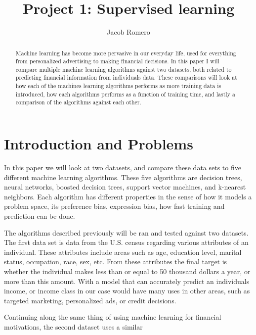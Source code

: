 \documentclass[
	letterpaper, %
]{IEEEtran}
\author{Jacob Romero}
\title{Project 1: Supervised learning}
\begin{document}
	\maketitle
	
	\begin{abstract}
		Machine learning has become more pervasive in our everyday life, used for everything from personalized advertising to making financial decisions. In this paper I will compare multiple machine learning algorithms against two datasets, both related to predicting financial information from individuals data. These comparisons will look at how each of the machines learning algorithms performs as more training data is introduced, how each algorithms performs as a function of training time, and lastly a comparison of the algorithms against each other.
	\end{abstract}
	
	\section{Introduction and Problems}
	In this paper we will look at two datasets, and compare these data sets to five different machine learning algorithms. These five algorithms are decision trees, neural networks, boosted decision trees, support vector machines, and k-nearest neighbors. Each algorithm has different properties in the sense of how it models a problem space, its preference bias, expression bias, how fast training and prediction can be done.
	
	The algorithms described previously will be ran and tested against two datasets. The first data set is data from the U.S. census regarding various attributes of an individual. These attributes include areas such as age, education level, marital status, occupation, race, sex, etc. From these attributes the final target is whether the individual makes less than or equal to 50 thousand dollars a year, or more than this amount. With a model that can accurately predict an individuals income, or income class in our case would have many uses in other areas, such as targeted marketing, personalized ads, or credit decisions.
	
	Continuing along the same thing of using machine learning for financial motivations, the second dataset uses a similar 
\end{document}
